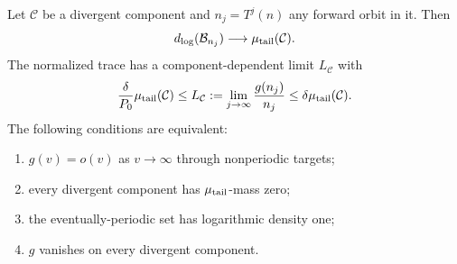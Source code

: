 \begin{proposition}\label{prop:ct-forward-components}
Let \(\mathcal C\) be a divergent component and
\(n_j=T^j(n)\) any forward orbit in it. Then
\[
 d_{\log}(\mathcal B_{n_j})\longrightarrow\mu_{\rm tail}(\mathcal C).
\]
The normalized trace has a component-dependent limit \(L_{\mathcal C}\)
with
\begin{equation}\label{eq:ct-component-ratio}
 \frac{\delta}{P_0}\mu_{\rm tail}(\mathcal C)
       \le L_{\mathcal C}
       :=\lim_{j\to\infty}\frac{g(n_j)}{n_j}
       \le\delta\mu_{\rm tail}(\mathcal C).
\end{equation}
The following conditions are equivalent:
\begin{enumerate}
\item \(g(v)=o(v)\) as \(v\to\infty\) through nonperiodic targets;
\item every divergent component has \(\mu_{\rm tail}\)-mass zero;
\item the eventually-periodic set has logarithmic density one;
\item \(g\) vanishes on every divergent component.
\end{enumerate}
\end{proposition}
